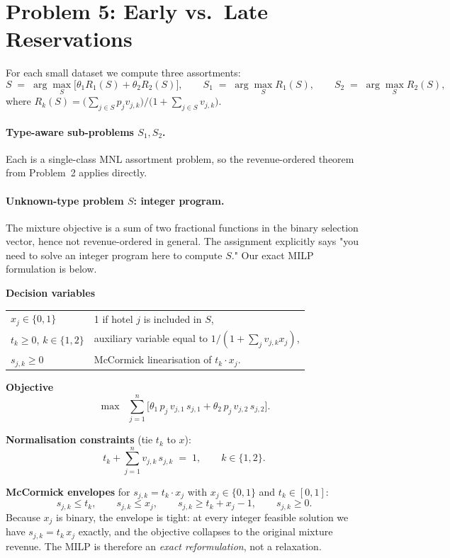\documentclass[11pt]{article}
\begin{document}
\FloatBarrier
\newpage

\section*{Problem 5: Early vs.\ Late Reservations}
\label{sec:p5}

For each small dataset we compute three assortments:
\[
S \;=\; \arg\max_S \big[\theta_1 R_1(S) + \theta_2 R_2(S)\big],
\qquad
S_1 \;=\; \arg\max_S R_1(S),
\qquad
S_2 \;=\; \arg\max_S R_2(S),
\]
where $R_k(S) = \big(\sum_{j \in S} p_j v_{j,k}\big) / \big(1 + \sum_{j \in S} v_{j,k}\big)$.

\paragraph{Type-aware sub-problems $S_1, S_2$.}
Each is a single-class MNL assortment problem, so the revenue-ordered
theorem from Problem~2 applies directly.

\paragraph{Unknown-type problem $S$: integer program.}
The mixture objective is a sum of two fractional functions in the
binary selection vector, hence not revenue-ordered in general. The
assignment explicitly says "you need to solve an integer program here to
compute $S$." Our exact MILP formulation is below.

\medskip
\noindent\textbf{Decision variables}
\begin{tabular}{ll}
$x_j \in \{0,1\}$            & 1 if hotel $j$ is included in $S$, \\
$t_k \ge 0$, $k \in \{1,2\}$ & auxiliary variable equal to $1/(1+\sum_j v_{j,k} x_j)$, \\
$s_{j,k} \ge 0$              & McCormick linearisation of $t_k \cdot x_j$.
\end{tabular}

\medskip
\noindent\textbf{Objective}
\[
\max\;\; \sum_{j=1}^{n}\!\Big[
   \theta_1\, p_j\, v_{j,1}\, s_{j,1} +
   \theta_2\, p_j\, v_{j,2}\, s_{j,2}
\Big].
\]

\noindent\textbf{Normalisation constraints} (tie $t_k$ to $x$):
\[
t_k + \sum_{j=1}^{n} v_{j,k}\, s_{j,k} \;=\; 1, \qquad k \in \{1,2\}.
\]

\noindent\textbf{McCormick envelopes} for $s_{j,k} = t_k\cdot x_j$ with
$x_j \in \{0,1\}$ and $t_k \in [0,1]$:
\[
s_{j,k} \le t_k, \qquad
s_{j,k} \le x_j, \qquad
s_{j,k} \ge t_k + x_j - 1, \qquad
s_{j,k} \ge 0.
\]
Because $x_j$ is binary, the envelope is tight: at every integer feasible
solution we have $s_{j,k} = t_k\, x_j$ exactly, and the objective collapses
to the original mixture revenue. The MILP is therefore an \emph{exact
reformulation}, not a relaxation.
\end{document}
